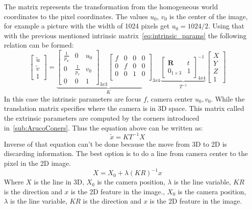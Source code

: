 The matrix represents the transformation from the homogeneous world coordinates to the pixel coordinates.
The values $u_0$, $v_0$ is the center of the image, for example a picture with the width of 1024 pixels get $u_0 = 1024/2$.
Using that with the previous mentioned intrinsic matrix~\ref{eq:intrinsic_params} the following relation can be formed:
\begin{equation}\label{eq:camera_transfer}
    \begin{bmatrix}
        \tilde{u} \\ \tilde{v} \\ 1
    \end{bmatrix} =
    \underbrace{
        \begin{bmatrix}
            \frac{1}{p_u} & 0 & u_0\\
            0 & \frac{1}{p_v} & v_0\\
            0 & 0 & 1
        \end{bmatrix}_{3x3}
        \begin{bmatrix}
            f & 0 & 0 & 0\\
            0 & f & 0 & 0\\
            0 & 0 & 1 & 0\\
        \end{bmatrix}_{3x4}
    }_K
    \underbrace{
        \begin{bmatrix}
            \mathbf{R} & t \\
            0_{1\times 3} & 1
        \end{bmatrix}^{-1}_{4x4}
    }_{T^{-1}}
    \begin{bmatrix}
        X \\ Y \\ Z \\ 1
    \end{bmatrix}
\end{equation}
In this case the intrinsic parameters are focus $f$, camera center $u_0,v_0$.
While the translation matrix specifies where the camera is in 3D space.
This matrix called the extrinsic parameters are computed by the \aruco corners introduced in~\ref{sub:ArucoConers}.
Thus the equation above can be written as:
\begin{equation}
    \tilde{x}  = KT^{-1}X
\end{equation}
Inverse of that equation can't be done because the move from 3D to 2D is discarding information.
The best option is to do a line from camera center to the pixel in the 2D image.
\begin{equation}
    X = X_0 + \lambda(KR)^{-1}  x
\end{equation}
Where $X$ is the line in 3D, $X_0$ is the camera position, $\lambda$ is the line variable, $KR$ is the direction and $x$ is the 2D feature in the image., $X_0$ is the camera position, $\lambda$ is the line variable, $KR$ is the direction and $x$ is the 2D feature in the image.



